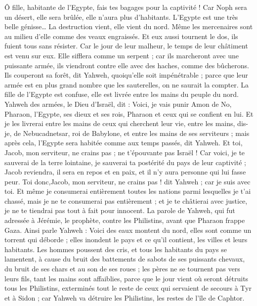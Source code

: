 \begin{multicols}{2}
Ô fille, habitante de l'Egypte, fais tes bagages pour la captivité ! Car Noph sera un désert, elle sera brûlée, elle n'aura plus d'habitants.
L'Egypte est une très belle génisse… La destruction vient, elle vient du nord.
Même les mercenaires sont au milieu d'elle comme des veaux engraissés. Et eux aussi tournent le dos, ils fuient tous sans résister. Car le jour de leur malheur, le temps de leur châtiment est venu sur eux.
Elle sifflera comme un serpent ; car ils marcheront avec une puissante armée, ils viendront contre elle avec des haches, comme des bûcherons.
Ils couperont sa forêt, dit Yahweh, quoiqu'elle soit impénétrable ; parce que leur armée est en plus grand nombre que les sauterelles, on ne saurait la compter.
La fille de l'Egypte est confuse, elle est livrée entre les mains du peuple du nord.
Yahweh des armées, le Dieu d'Israël, dit : Voici, je vais punir Amon de No, Pharaon, l'Egypte, ses dieux et ses rois, Pharaon et ceux qui se confient en lui.
Et je les livrerai entre les mains de ceux qui cherchent leur vie, entre les mains, dis-je, de Nebucadnetsar, roi de Babylone, et entre les mains de ses serviteurs ; mais après cela, l'Egypte sera habitée comme aux temps passés, dit Yahweh.
Et toi, Jacob, mon serviteur, ne crains pas ; ne t'épouvante pas Israël ! Car voici, je te sauverai de la terre lointaine, je sauverai ta postérité du pays de leur captivité ; Jacob reviendra, il sera en repos et en paix, et il n'y aura personne qui lui fasse peur.
Toi donc,Jacob, mon serviteur, ne crains pas ! dit Yahweh ; car je suis avec toi. Et même je consumerai entièrement  toutes les nations parmi lesquelles je t'ai chassé, mais je ne te consumerai pas entièrement ; et je te châtierai avec justice, je ne te tiendrai pas tout à fait pour innocent.
\VerseOne{}La parole de Yahweh, qui fut adressée à Jérémie, le prophète, contre les Philistins, avant que Pharaon frappe Gaza.
Ainsi parle Yahweh : Voici des eaux montent du nord, elles sont comme un torrent qui déborde ; elles inondent le pays et ce qu'il contient, les villes et leurs habitants. Les hommes poussent des cris, et tous les habitants du pays se lamentent,
à cause du bruit des battements de sabots de ses puissants chevaux, du bruit de ses chars et au son de ses roues ; les pères ne se tournent pas vers leurs fils, tant les mains sont affaiblies,
parce que le jour vient où seront détruits tous les Philistins, exterminés tout le reste de ceux qui servaient de secours à Tyr et à Sidon ; car Yahweh va détruire les Philistins, les restes de l'île de Caphtor.

\end{multicols}
